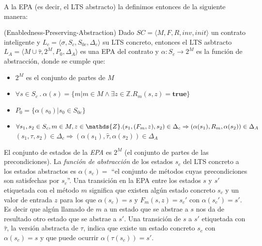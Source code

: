 A la EPA (es decir, el LTS abstracto) la definimos entonces de la siguiente manera:

\begin{definition}\label{definicion-epa}(Enabledness-Preserving-Abstraction) Dado $SC = \langle M, F, R, inv, init \rangle$ un contrato inteligente y $L_c = \langle \sigma , S_c, S_{0c}, \Delta _c \rangle$ su LTS concreto, entonces el LTS asbtracto $L_A = \langle M \cup \hat{\tau} , 2^M, P_0, \Delta _A \rangle$ es una EPA del contrato y $\alpha : S_c \rightarrow 2^M$ es la función de abstracción, donde se cumple que:
    \begin{itemize}
        \item $2^M$ es el conjunto de partes de $M$
        \item $\forall s \in S_c \: . \:
                  \alpha(s) = \{m | m \in M \land \exists z \in \mathds{Z} . R_m(s,z) = \textbf{true}\}$
        \item $P_0 = \{\alpha(s_0) | s_0 \in S_{0c} \}$
        \item $\forall s_1,s_2 \in S_c, m \in M, z \in \mathds{Z} . \\ (s_1,(F_m,z),s_2) \in \Delta _c \Rightarrow (\alpha(s_1),R_m,\alpha(s_2)) \in \Delta _A$ \\
              $(s_1,\tau,s_2) \in \Delta _c \Rightarrow (\alpha(s_1),\hat{\tau},\alpha(s_2)) \in \Delta _A$
    \end{itemize}
\end{definition}

El conjunto de estados de la \textit{EPA} es $2^M$ (el conjunto de partes de las precondiciones).
La \textit{función de abstracción} de los estados $s_c$ del LTS concreto a los estados abstractos es $\alpha (s_c) = $ ``el conjunto de métodos cuyas precondiciones son satisfechas por $s_c$''.
Una transición en la EPA entre los estados $s$ y $s'$ etiquetada con el método $m$ significa que existen algún estado concreto $s_c$ y un valor de entrada $z$ para los que $\alpha(s_c) = s$ y  $F_m(s,z)=s_c'$ con $\alpha(s_c') = s'$.
Es decir que algún llamado de $m$ a un estado que se abstrae a $s$ nos da de resultado otro estado que se abstrae a $s'$.
Una transición de $s$ a $s'$ etiquetada  con $\hat{\tau}$, la versión abstracta de $\tau$, indica que existe un estado concreto $s_c$ con $\alpha(s_c) = s$ y que puede ocurrir $\alpha (\tau (s_c)) = s'$.
